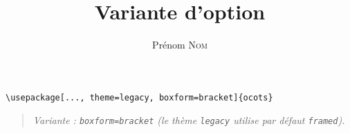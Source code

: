 \documentclass[11pt]{ocots-book}
\title{Variante d'option}
\author{Prénom \textsc{Nom}}
\newcommand{\ocotsvariantnote}[1]{\begin{quote}\itshape Variante : #1\end{quote}}
\begin{document}
\maketitle

\begin{lstlisting}
\usepackage[..., theme=legacy, boxform=bracket]{ocots}
\end{lstlisting}
\ocotsvariantnote{\texttt{boxform=bracket} (le th\`eme \texttt{legacy} utilise par d\'efaut \texttt{framed}).}

\end{document}
